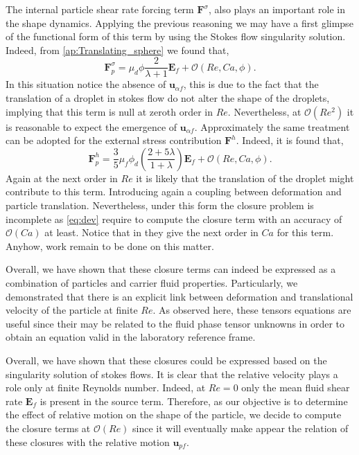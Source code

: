 The internal particle shear rate forcing term $\textbf{F}^\sigma$, also plays an important role in the shape dynamics. 
Applying the previous reasoning we may have a first glimpse of the functional form of this term by using the Stokes flow singularity solution. 
Indeed, from \ref{ap:Translating_sphere} we found that, 
\begin{equation*}
    \textbf{F}_p^{\sigma}
    = \mu_d \phi \frac{ 2 }{\lambda+1}
    \textbf{E}_f
    + \mathcal{O}(Re,Ca,\phi). 
\end{equation*}
In this situation notice the absence of $\textbf{u}_{\alpha f}$, this is due to the fact that the translation of a droplet in stokes flow do not alter the shape of the droplets, implying that this term is null at zeroth order in $Re$. 
Nevertheless, at $\mathcal{O}(Re^2)$ it is reasonable to expect the emergence of $\textbf{u}_{\alpha f}$.
Approximately the same treatment can be adopted for the external stress contribution $\textbf{F}^h$. 
Indeed, it is found that, 
\begin{equation*}
    \textbf{F}^h_p
    = 
    \frac{3}{5}\mu_f \phi_d \left(\frac{2+5\lambda}{1+\lambda}\right)
    \textbf{E}_f
    + \mathcal{O}(Re,Ca,\phi).
\end{equation*}
Again at the next order in $Re$ it is likely that the translation of the droplet might contribute to this term. 
Introducing again a coupling between deformation and particle translation. 
Nevertheless, under this form the closure problem is incomplete as \ref{eq:dev} require to compute the closure term with an accuracy of $\mathcal{O}(Ca)$ at least. 
Notice that in \citet{raja2010inertial} they give the next order in $Ca$ for this term.
Anyhow, work remain to be done on this matter. 


Overall, we have shown that these closure terms can indeed be expressed as a combination of particles and carrier fluid properties.
Particularly, we demonstrated that there is an explicit link between deformation and translational velocity of the particle at finite $Re$. 
As observed here, these tensors equations are useful since their may be related to the fluid phase tensor unknowns in order to obtain an equation valid in the laboratory reference frame. 

Overall, we have shown that these closures could be expressed based on the singularity solution of stokes flows. 
It is clear that the relative velocity plays a role only at finite Reynolds number. 
Indeed, at $Re = 0$ only the mean fluid shear rate $\textbf{E}_f$ is present in the source term. 
Therefore, as our objective is to determine the effect of relative motion on the shape of the particle, we decide to compute the closure terms at $\mathcal{O}(Re)$ since it will eventually make appear the relation of these closures with the relative motion $\textbf{u}_{pf}$. 


